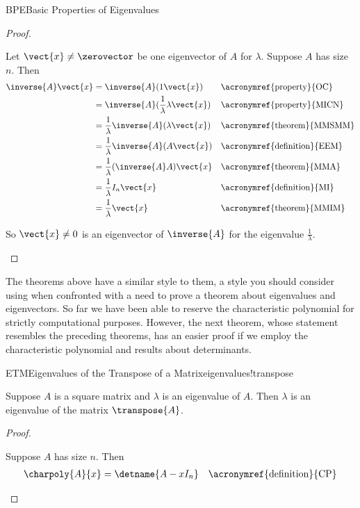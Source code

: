 \begin{subsect}{BPE}{Basic Properties of Eigenvalues}
\begin{proof}
%
\begin{para}Let $\vect{x}\neq\zerovector$ be one eigenvector of $A$ for $\lambda$. Suppose $A$ has size $n$.  Then
%
\begin{align*}
\inverse{A}\vect{x}&=\inverse{A}(1\vect{x})&&\text{\acronymref{property}{OC}}\\
&=\inverse{A}(\frac{1}{\lambda}\lambda\vect{x})&&\text{\acronymref{property}{MICN}}\\
&=\frac{1}{\lambda}\inverse{A}(\lambda\vect{x})&&\text{\acronymref{theorem}{MMSMM}}\\
&=\frac{1}{\lambda}\inverse{A}(A\vect{x})&&\text{\acronymref{definition}{EEM}}\\
&=\frac{1}{\lambda}(\inverse{A}A)\vect{x}&&\text{\acronymref{theorem}{MMA}}\\
&=\frac{1}{\lambda}I_n\vect{x}&&\text{\acronymref{definition}{MI}}\\
&=\frac{1}{\lambda}\vect{x}&&\text{\acronymref{theorem}{MMIM}}
%
\end{align*}
\end{para}
%
\begin{para}So $\vect{x}\neq 0$ is an eigenvector of $\inverse{A}$ for the eigenvalue $\frac{1}{\lambda}$.\end{para}
%
\end{proof}
%
\begin{para}The theorems above have a similar style to them, a style you should consider using when confronted with a need to prove a theorem about eigenvalues and eigenvectors.  So far we have been able to reserve the characteristic polynomial for strictly computational purposes.  However, the next theorem, whose statement resembles the preceding theorems, has an easier proof if we employ the characteristic polynomial and results about determinants.\end{para}
%
\begin{theorem}{ETM}{Eigenvalues of the Transpose of a Matrix}{eigenvalues!transpose}
\begin{para}Suppose $A$ is a square matrix and $\lambda$ is an eigenvalue of $A$.  Then $\lambda$ is an eigenvalue of the matrix $\transpose{A}$.\end{para}
\end{theorem}
%
\begin{proof}
%
\begin{para}Suppose $A$ has size $n$.  Then
%
\begin{align*}
\charpoly{A}{x}
&=\detname{A-xI_n}&&\text{\acronymref{definition}{CP}}\\

\end{align*}
\end{para}
\end{proof}
\end{subsect}
